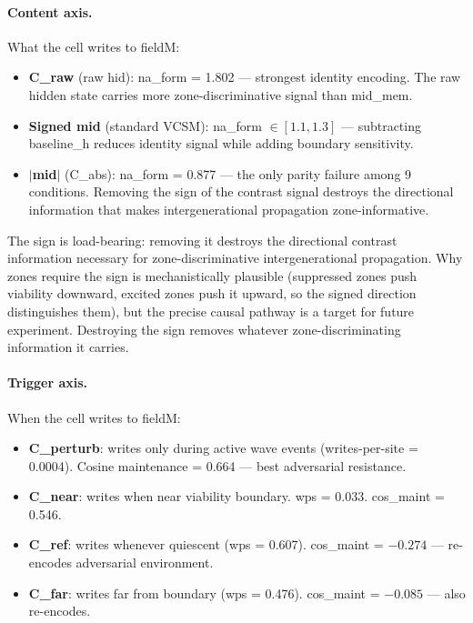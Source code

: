 \documentclass[11pt,a4paper]{article}
\begin{document}
\paragraph{Content axis.}
What the cell writes to fieldM:
\begin{itemize}
  \item \textbf{C\_raw} (raw hid): na\_form = 1.802 --- strongest identity
    encoding. The raw hidden state carries more zone-discriminative signal
    than mid\_mem.
  \item \textbf{Signed mid} (standard VCSM): na\_form $\in [1.1, 1.3]$ ---
    subtracting baseline\_h reduces identity signal while adding boundary
    sensitivity.
  \item \textbf{$|$mid$|$} (C\_abs): na\_form = 0.877 --- the only parity
    failure among 9 conditions. Removing the sign of the contrast signal
    destroys the directional information that makes intergenerational
    propagation zone-informative.
\end{itemize}

The sign is load-bearing: removing it destroys the directional contrast
information necessary for zone-discriminative intergenerational propagation.
Why zones require the sign is mechanistically plausible (suppressed zones push
viability downward, excited zones push it upward, so the signed direction
distinguishes them), but the precise causal pathway is a target for future
experiment.
Destroying the sign removes whatever zone-discriminating information it carries.

\paragraph{Trigger axis.}
When the cell writes to fieldM:
\begin{itemize}
  \item \textbf{C\_perturb}: writes only during active wave events
    (writes-per-site = 0.0004).
    Cosine maintenance = 0.664 --- best adversarial resistance.
  \item \textbf{C\_near}: writes when near viability boundary.
    wps = 0.033. cos\_maint = 0.546.
  \item \textbf{C\_ref}: writes whenever quiescent (wps = 0.607).
    cos\_maint = $-0.274$ --- re-encodes adversarial environment.
  \item \textbf{C\_far}: writes far from boundary (wps = 0.476).
    cos\_maint = $-0.085$ --- also re-encodes.
\end{itemize}
\end{document}
